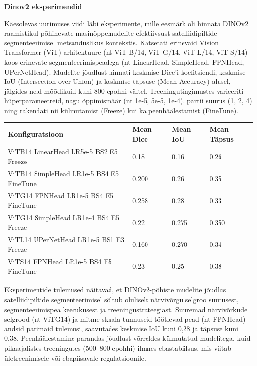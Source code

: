 \textbf{Dinov2 eksperimendid}

Käesolevas uurimuses viidi läbi eksperimente, mille eesmärk oli hinnata DINOv2
raamistikul põhinevate masinõppemudelite efektiivsust satelliidipiltide
segmenteerimisel metsanduslikus kontekstis. Katsetati erinevaid Vision
Transformer (ViT) arhitektuure (nt ViT-B/14, ViT-G/14, ViT-L/14, ViT-S/14) koos
erinevate segmenteerimispeadega (nt LinearHead, SimpleHead, FPNHead,
UPerNetHead). Mudelite jõudlust hinnati keskmise Dice'i koefitsiendi, keskmise
IoU (Intersection over Union) ja keskmise täpsuse (Mean Accuracy) alusel,
jälgides neid mõõdikuid kuni 800 epohhi vältel. Treeningutingimustes varieeriti
hüperparameetreid, nagu õppimismäär (nt 1e-5, 5e-5, 1e-4), partii suurus (1, 2,
4) ning rakendati nii külmutamist (Freeze) kui ka peenhäälestamist (FineTune).

\bigskip

\begin{table}[H]
    \caption{DINOv2 eksperimendi tulemused}
    \label{tab:dinov2_results}
    \begin{longtable}{llll}
    \textbf{Konfiguratsioon} & \textbf{Mean Dice} & \textbf{Mean IoU} & \textbf{Mean Täpsus} \\
    \hline
    ViTB14 LinearHead LR5e-5 BS2 E5 Freeze & 0.18 & 0.16 & 0.26 \\
    ViTB14 SimpleHead LR1e-5 BS4 E5 FineTune & 0.200 & 0.26 & 0.35 \\
    ViTG14 FPNHead LR1e-5 BS4 E5 FineTune & 0.258 & 0.28 & 0.33 \\
    ViTG14 SimpleHead LR1e-4 BS4 E5 Freeze & 0.22 & 0.275 & 0.350 \\
    ViTL14 UPerNetHead LR1e-5 BS1 E3 Freeze & 0.160 & 0.270 & 0.34 \\
    ViTS14 FPNHead LR1e-5 BS4 E5 FineTune & 0.23 & 0.25 & 0.38 \\
    \hline
\end{longtable}
\end{table}
\addtocounter{table}{-1}


\bigskip

Eksperimentide tulemused näitavad, et DINOv2-põhiste mudelite jõudlus satelliidipiltide segmenteerimisel sõltub oluliselt närvivõrgu selgroo suurusest, segmenteerimispea keerukusest ja treeningustrateegiast. Suuremad närvivõrkude selgrood (nt ViTG14) ja mitme skaala tunnuseid töötlevad pead (nt FPNHead) andsid parimaid tulemusi, saavutades keskmise IoU kuni 0,28 ja täpsuse kuni 0,38. Peenhäälestamine parandas jõudlust võrreldes külmutatud mudelitega, kuid pikaajalistes treeningutes (500–800 epohhi) ilmnes ebastabiilsus, mis viitab ületreenimisele või ebapiisavale regulatsioonile.

